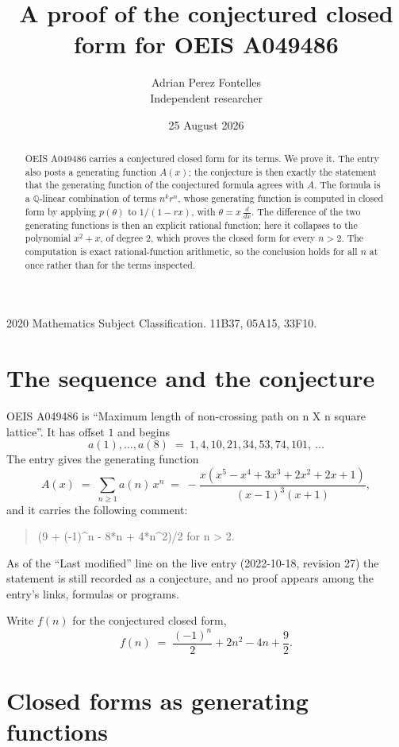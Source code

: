 \documentclass[11pt,a4paper]{article}
\title{A proof of the conjectured closed form for OEIS A049486}
\author{Adrian Perez Fontelles\\ \small Independent researcher}
\date{25 August 2026}
\theoremstyle{plain}
\theoremstyle{definition}
\begin{document}
\maketitle

\begin{abstract}
OEIS A049486 carries a conjectured closed form for its terms. We prove it. The entry
also posts a generating function $A(x)$; the conjecture is then exactly the statement
that the generating function of the conjectured formula agrees with $A$. The formula is
a $\mathbb{Q}$-linear combination of terms $n^{k}r^{n}$, whose generating function is
computed in closed form by applying $p(\theta)$ to $1/(1-rx)$, with
$\theta=x\,\frac{d}{dx}$. The difference of the two generating functions is then an
explicit rational function; here it collapses to the polynomial $x^{2} + x$, of degree
$2$, which proves the closed form for every $n>2$. The computation is exact
rational-function arithmetic, so the conclusion holds for all $n$ at once rather than
for the terms inspected.
\end{abstract}

\noindent\small 2020 Mathematics Subject Classification. 11B37, 05A15, 33F10.\normalsize

\section{The sequence and the conjecture}

OEIS A049486 is ``Maximum length of non-crossing path on n X n square lattice''. It has offset $1$ and begins
\[
a(1),\dots,a(8)\;=\;1, 4, 10, 21, 34, 53, 74, 101,\ \dots
\]
The entry gives the generating function
\begin{equation}\label{eq:gf}
A(x)\;=\;\sum_{n\ge 1} a(n)\,x^{n}\;=\;- \frac{x \left(x^{5} - x^{4} + 3 x^{3} + 2 x^{2} + 2 x + 1\right)}{\left(x - 1\right)^{3} \left(x + 1\right)} ,
\end{equation}
and it carries the following comment:
\begin{quote}\small
(9 + (-1)\^{}n - 8*n + 4*n\^{}2)/2 for n > 2.
\end{quote}
As of the ``Last modified'' line on the live entry (2022-10-18, revision 27) the
statement is still recorded as a conjecture, and no proof appears among the entry's links,
formulas or programs.

Write $f(n)$ for the conjectured closed form,
\[
f(n)\;=\;\frac{\left(-1\right)^{n}}{2} + 2 n^{2} - 4 n + \frac{9}{2} .
\]

\section{Closed forms as generating functions}
\end{document}
